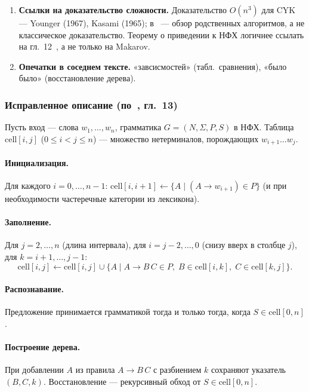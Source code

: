\begin{enumerate}
	\item \textbf{Ссылки на доказательство сложности.}
	Доказательство $O(n^3)$ для CYK --- Younger (1967), Kasami (1965); в~\cite{makarov2022cyk} --- обзор родственных алгоритмов, а не классическое доказательство.
	Теорему о приведении к НФХ логичнее ссылать на гл.~12~\cite{jurafsky2026speech}, а не только на Makarov.

	\item \textbf{Опечатки в соседнем тексте.}
	«завсисмостей» (табл.~сравнения), «было было» (восстановление дерева).
\end{enumerate}

\subsubsection{Исправленное описание (по~\cite{jurafsky2026speech}, гл.~13)}

Пусть вход --- слова $w_1,\ldots,w_n$, грамматика $G=(N,\Sigma,P,S)$ в НФХ.
Таблица $\mathrm{cell}[i,j]$ ($0 \le i < j \le n$) --- множество нетерминалов, порождающих $w_{i+1}\ldots w_j$.

\paragraph{Инициализация.}
Для каждого $i=0,\ldots,n{-}1$:
$\mathrm{cell}[i,i{+}1] \gets \{A \mid (A \to w_{i+1}) \in P\}$ (и при необходимости частеречные категории из лексикона).

\paragraph{Заполнение.}
Для $j = 2,\ldots,n$ (длина интервала), для $i = j{-}2,\ldots,0$ (снизу вверх в столбце $j$), для $k = i{+}1,\ldots,j{-}1$:
\[
	\mathrm{cell}[i,j] \gets \mathrm{cell}[i,j] \cup
	\{A \mid A \to B\,C \in P,\; B \in \mathrm{cell}[i,k],\; C \in \mathrm{cell}[k,j]\}.
\]

\paragraph{Распознавание.}
Предложение принимается грамматикой тогда и только тогда, когда $S \in \mathrm{cell}[0,n]$.

\paragraph{Построение дерева.}
При добавлении $A$ из правила $A \to B\,C$ с разбиением $k$ сохраняют указатель $(B,C,k)$.
Восстановление --- рекурсивный обход от $S \in \mathrm{cell}[0,n]$.


